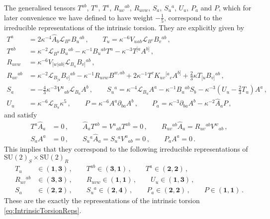\documentclass{PoS}
\newcommand{\SU}[1]{\mathrm{SU}( #1 )}
\newcommand{\mbf}[1]{\mathbf{#1}}
\newcommand{\gL}{\mathcal{L}}
\newcommand{\hA}{\hat{A}}
\begin{document}
The generalised tensors $T^{ab}$, $T^u$, $T^a$, $R_{uv}{}^{ab}$, $R_{uvw}$, $S_a$,  $S_u{}^a$, $U_u$, $P_a$ and $P$, which for later convenience we have defined to have weight $-\frac15$, correspond to the irreducible representations of the intrinsic torsion. They are explicitly given by
\begin{equation}
 \begin{split}
  T^a &= 2 \kappa^{-4} \hA_b \gL_{B^u} B_{u}{}^{ab} \,, \qquad T_u = \kappa^{-6} V_u{}_{ab} \gL_{B^v} B_v{}^{ab} \,, \\
  T^{ab} &= \kappa^{-2} \gL_{B^u} B_u{}^{ab} - \kappa^{-1} B_u{}^{ab} T^u - \kappa^{-3} T^{[a} A^{b]} \,, \\
  R_{uvw} &= \kappa^{-6} V_{[w|ab|} \gL_{B_u} B_{v]}{}^{ab} \,, \\
  R_{uv}{}^{ab} &= \kappa^{-2} \gL_{B_{[u}} B_{v]}{}^{ab} - \kappa^{-1} R_{uvw} B^{w,ab} + 2 \kappa^{-1} T^c K_{uv}{}^{[a}{}_c A^{b]} + \frac23 \kappa T_{[u} B_{v]}{}^{ab} \,, \\
  S_a &= -\frac43 \kappa^{-3} V^u{}_{ab} \gL_{B_u} A^b \,, \qquad S_u{}^a = \kappa^{-4} \gL_{B_u} A^a - \kappa^{-1} B_u{}^{ab} S_b - \kappa^{-3} \left(U_u - \frac23 T_u \right) A^a \,, \\
  U_u &= \kappa^{-6} \gL_{B_u} \kappa^5 \,, \qquad P = \kappa^{-6} A^a \partial_{ba} A^b \,, \qquad P_a = \kappa^{-3} \partial_{ba} A^b - \kappa^{-2} \hA_a P \,,
 \end{split}
\end{equation}
and satisfy
\begin{equation}
 \begin{split}
  T^a \hA_a &= 0 \,, \qquad \hA_a T^{ab} = V^u{}_{ab} T^{ab} = 0 \,, \qquad R_{uv}{}^{ab} \hA_a = R_{uv}{}^{ab} V^w{}_{ab} \,, \\
  S_a A^a &= 0 \,, \qquad S_u{}^a \hA_a = S_u{}^a V^u{}_{ab} = 0 \,, \qquad P_a A^a = 0 \,.
 \end{split}
\end{equation}
This implies that they correspond to the following irreducible representations of $\SU{2}_S \times \SU{2}_R$
\begin{equation}
 \begin{split}
  T_u &\in \left(\mbf{1},\mbf{3}\right) \,, \qquad T^{ab} \in \left(\mbf{3},\mbf{1}\right) \,, \qquad T^a \in \left(\mbf{2},\mbf{2}\right) \,, \\
  R_{uv}{}^{ab} &\in \left(\mbf{3},\mbf{3}\right) \,, \qquad R_{uvw} \in \left(\mbf{1},\mbf{1}\right) \,, \qquad U_u \in \left(\mbf{1},\mbf{3}\right) \,, \\
  S_a &\in \left(\mbf{2},\mbf{2}\right) \,, \qquad S_u{}^a \in \left(\mbf{2},\mbf{4}\right) \,, \qquad P_a \in \left(\mbf{2},\mbf{2}\right) \,, \qquad  P \in \left(\mbf{1},\mbf{1}\right) \,.
 \end{split}
\end{equation}
These are the exactly the representations of the intrinsic torsion \eqref{eq:IntrinsicTorsionReps}.
\end{document}
